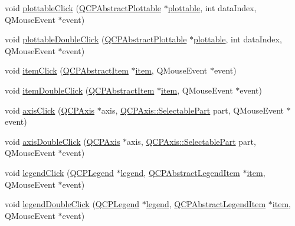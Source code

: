 \begin{DoxyCompactItemize}
\item 
void \hyperlink{class_q_custom_plot_af5fe78b8bc9e4e96df921612837fd4fd}{plottable\+Click} (\hyperlink{class_q_c_p_abstract_plottable}{Q\+C\+P\+Abstract\+Plottable} $\ast$\hyperlink{class_q_custom_plot_a32de81ff53e263e785b83b52ecd99d6f}{plottable}, int data\+Index, Q\+Mouse\+Event $\ast$event)
\item 
void \hyperlink{class_q_custom_plot_a86a3ab7263c9c4e008e70d6c5fce9fbd}{plottable\+Double\+Click} (\hyperlink{class_q_c_p_abstract_plottable}{Q\+C\+P\+Abstract\+Plottable} $\ast$\hyperlink{class_q_custom_plot_a32de81ff53e263e785b83b52ecd99d6f}{plottable}, int data\+Index, Q\+Mouse\+Event $\ast$event)
\item 
void \hyperlink{class_q_custom_plot_ae16b51f52d2b7aebbc7e3e74e6ff2e4b}{item\+Click} (\hyperlink{class_q_c_p_abstract_item}{Q\+C\+P\+Abstract\+Item} $\ast$\hyperlink{class_q_custom_plot_a3e842b5a65b1d17fbb96cfb1fa1314d1}{item}, Q\+Mouse\+Event $\ast$event)
\item 
void \hyperlink{class_q_custom_plot_ac83aa9f5a3e9bb3efc9cdc763dcd42a6}{item\+Double\+Click} (\hyperlink{class_q_c_p_abstract_item}{Q\+C\+P\+Abstract\+Item} $\ast$\hyperlink{class_q_custom_plot_a3e842b5a65b1d17fbb96cfb1fa1314d1}{item}, Q\+Mouse\+Event $\ast$event)
\item 
void \hyperlink{class_q_custom_plot_abf635f8b56ab5c16d5de9f358543e82b}{axis\+Click} (\hyperlink{class_q_c_p_axis}{Q\+C\+P\+Axis} $\ast$axis, \hyperlink{class_q_c_p_axis_abee4c7a54c468b1385dfce2c898b115f}{Q\+C\+P\+Axis\+::\+Selectable\+Part} part, Q\+Mouse\+Event $\ast$event)
\item 
void \hyperlink{class_q_custom_plot_a6df35357460181a72da3e93d600f5256}{axis\+Double\+Click} (\hyperlink{class_q_c_p_axis}{Q\+C\+P\+Axis} $\ast$axis, \hyperlink{class_q_c_p_axis_abee4c7a54c468b1385dfce2c898b115f}{Q\+C\+P\+Axis\+::\+Selectable\+Part} part, Q\+Mouse\+Event $\ast$event)
\item 
void \hyperlink{class_q_custom_plot_a79cff0baafbca10a3aaf694d2d3b9ab3}{legend\+Click} (\hyperlink{class_q_c_p_legend}{Q\+C\+P\+Legend} $\ast$\hyperlink{class_q_custom_plot_a4eadcd237dc6a09938b68b16877fa6af}{legend}, \hyperlink{class_q_c_p_abstract_legend_item}{Q\+C\+P\+Abstract\+Legend\+Item} $\ast$\hyperlink{class_q_custom_plot_a3e842b5a65b1d17fbb96cfb1fa1314d1}{item}, Q\+Mouse\+Event $\ast$event)
\item 
void \hyperlink{class_q_custom_plot_a0250f835c044521df1619b132288bca7}{legend\+Double\+Click} (\hyperlink{class_q_c_p_legend}{Q\+C\+P\+Legend} $\ast$\hyperlink{class_q_custom_plot_a4eadcd237dc6a09938b68b16877fa6af}{legend}, \hyperlink{class_q_c_p_abstract_legend_item}{Q\+C\+P\+Abstract\+Legend\+Item} $\ast$\hyperlink{class_q_custom_plot_a3e842b5a65b1d17fbb96cfb1fa1314d1}{item}, Q\+Mouse\+Event $\ast$event)

\end{DoxyCompactItemize}
